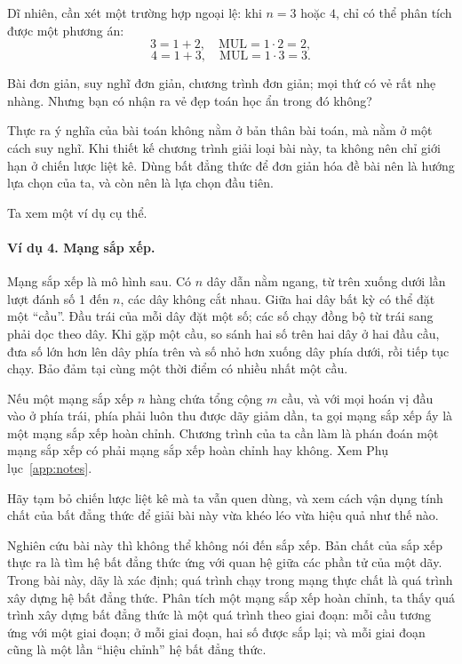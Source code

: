 \documentclass[11pt]{article}
\begin{document}
Dĩ nhiên, cần xét một trường hợp ngoại lệ: khi \(n=3\) hoặc \(4\), chỉ có thể
phân tích được một phương án:
\[
  3=1+2,\quad \mathrm{MUL}=1\cdot2=2,
\]
\[
  4=1+3,\quad \mathrm{MUL}=1\cdot3=3.
\]

Bài đơn giản, suy nghĩ đơn giản, chương trình đơn giản; mọi thứ có vẻ rất nhẹ
nhàng. Nhưng bạn có nhận ra vẻ đẹp toán học ẩn trong đó không?

Thực ra ý nghĩa của bài toán không nằm ở bản thân bài toán, mà nằm ở một cách
suy nghĩ. Khi thiết kế chương trình giải loại bài này, ta không nên chỉ giới
hạn ở chiến lược liệt kê. Dùng bất đẳng thức để đơn giản hóa đề bài nên là
hướng lựa chọn của ta, và còn nên là lựa chọn đầu tiên.

Ta xem một ví dụ cụ thể.

\paragraph{Ví dụ 4. Mạng sắp xếp.}
Mạng sắp xếp là mô hình sau. Có \(n\) dây dẫn nằm ngang, từ trên xuống dưới
lần lượt đánh số 1 đến \(n\), các dây không cắt nhau. Giữa hai dây bất kỳ có
thể đặt một ``cầu''. Đầu trái của mỗi dây đặt một số; các số chạy đồng bộ từ
trái sang phải dọc theo dây. Khi gặp một cầu, so sánh hai số trên hai dây ở
hai đầu cầu, đưa số lớn hơn lên dây phía trên và số nhỏ hơn xuống dây phía
dưới, rồi tiếp tục chạy. Bảo đảm tại cùng một thời điểm có nhiều nhất một
cầu.

Nếu một mạng sắp xếp \(n\) hàng chứa tổng cộng \(m\) cầu, và với mọi hoán vị
đầu vào ở phía trái, phía phải luôn thu được dãy giảm dần, ta gọi mạng sắp
xếp ấy là một mạng sắp xếp hoàn chỉnh. Chương trình của ta cần làm là phán
đoán một mạng sắp xếp có phải mạng sắp xếp hoàn chỉnh hay không. Xem
Phụ lục~\ref{app:notes}.

Hãy tạm bỏ chiến lược liệt kê mà ta vẫn quen dùng, và xem cách vận dụng tính
chất của bất đẳng thức để giải bài này vừa khéo léo vừa hiệu quả như thế nào.

Nghiên cứu bài này thì không thể không nói đến sắp xếp. Bản chất của sắp xếp
thực ra là tìm hệ bất đẳng thức ứng với quan hệ giữa các phần tử của một dãy.
Trong bài này, dãy là xác định; quá trình chạy trong mạng thực chất là quá
trình xây dựng hệ bất đẳng thức. Phân tích một mạng sắp xếp hoàn chỉnh, ta
thấy quá trình xây dựng bất đẳng thức là một quá trình theo giai đoạn: mỗi
cầu tương ứng với một giai đoạn; ở mỗi giai đoạn, hai số được sắp lại; và mỗi
giai đoạn cũng là một lần ``hiệu chỉnh'' hệ bất đẳng thức.
\end{document}
